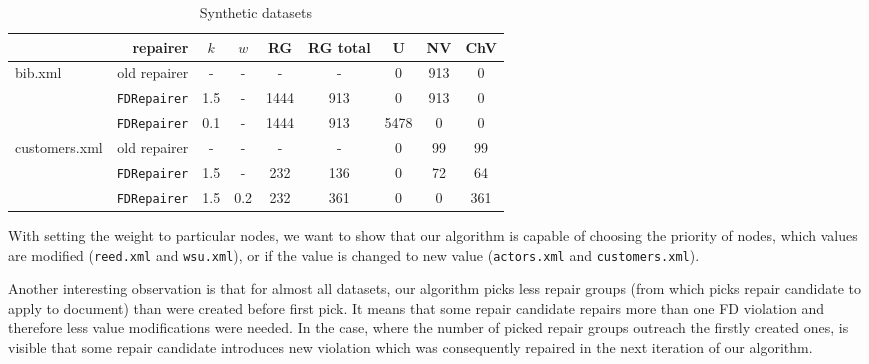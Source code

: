 \begin{table}
    \begin{tabular}{| l | r | *{7}{c|}}
    \hline
    & repairer & $k$ & $w$ & RG & RG total & U & NV & ChV\\ \hline
    \multirow{3}{*}{bib.xml} & old repairer & - & - & - & - & 0 & 913 & 0\\
    & \texttt{FDRepairer} & 1.5 & - & 1444 & 913 & 0 & 913 & 0\\
    & \texttt{FDRepairer} & 0.1 & - & 1444 & 913 & 5478 & 0 & 0\\ \hline
    \multirow{3}{*}{customers.xml} & old repairer & - & - & - & - & 0 & 99 & 99\\
    & \texttt{FDRepairer} & 1.5 & - & 232 & 136 & 0 & 72 & 64\\
    & \texttt{FDRepairer} & 1.5 & 0.2 & 232 & 361 & 0 & 0 & 361\\\hline
    \end{tabular}
\caption{Synthetic datasets}
\label{syntheticTable}
\end{table}

With setting the weight to particular nodes, we want to show that our algorithm is capable of choosing the priority of nodes, which values are modified (\texttt{reed.xml} and \texttt{wsu.xml}), or if the value is changed to new value (\texttt{actors.xml} and \texttt{customers.xml}).

Another interesting observation is that for almost all datasets, our algorithm picks less repair groups (from which picks repair candidate to apply to document) than were created before first pick. It means that some repair candidate repairs more than one FD violation and therefore less value modifications were needed. In the case, where the number of picked repair groups outreach the firstly created ones, is visible that some repair candidate introduces new violation which was consequently repaired in the next iteration of our algorithm.

